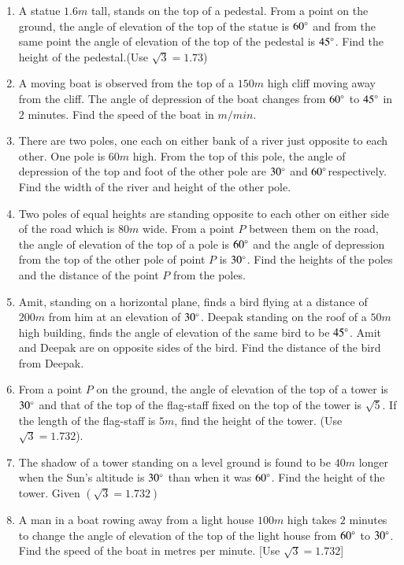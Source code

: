 \begin{enumerate}[label=\thesubsection.\arabic*.,ref=\thesubsection.\theenumi]
\begin{figure}[H]
\caption{}      
\label{fig:Fig-4.png}
\end{figure}
\hfill{}\item A statue $1.6m$ tall, stands on the top of a pedestal. From a point on the ground, the angle of elevation of the top of the statue is $60\degree$ and from the same point the angle of elevation of the top of the pedestal is $45\degree$. Find the height of the pedestal.(Use $\sqrt{3}=1.73$)
\hfill{}
\item A moving boat is observed from the top of a $150m$ high cliff moving away from the cliff. The angle of depression of the boat changes from $60\degree$ to $45\degree$ in $2$ minutes. Find the speed of the boat in $m/min$.
%
\hfill{}\item There are two poles, one each on either bank of a river just opposite to each other. One pole is $60m$ high. From the top of this pole, the angle of depression of the top and foot of the other pole are $30\degree$ and $60\degree$respectively. Find the width of the river and height of the other pole.
%
\hfill{}\item Two poles of equal heights are standing opposite to each other on either side of the road which is $80 m$ wide. From a point $P$ between them on the road, the angle of elevation of the top of a pole is $60\degree$ and the angle of depression from the top of the other pole of point $P$ is $30\degree$. Find the heights of the poles and the distance of the point $P$ from the poles.
%
\hfill{}\item Amit, standing on a horizontal plane, finds a bird flying at a distance of $200 m$ from him at an elevation of $30\degree$. Deepak standing on the roof of a $50 m$ high building, finds the angle of elevation of the same bird to be $45\degree$. Amit and Deepak are on opposite sides of the bird. Find the distance of the bird from Deepak.
%
\hfill{}\item From a point $P$ on the ground, the angle of elevation of the top of a tower is $30\degree$ and that of the top of the flag-staff fixed on the top of the tower is $\sqrt{5}$. If the length of the flag-staff is $5 m$, find the height of the tower. (Use $\sqrt{3}= 1.732$).
%
%
\hfill{}\item The shadow of a tower standing on a level ground is found to be $40 m$ longer when the Sun's altitude is $30\degree$ than when it was $60\degree$. Find the height of the tower. Given $(\sqrt{3} = 1.732)$
%
\hfill{}\item A man in a boat rowing away from a light house $100m$  high takes $2$ minutes to change the angle of elevation of the top of the light house from $60\degree$ to $30\degree$. Find the speed of the boat in metres per minute. [Use $\sqrt{3}=1.732$]

\end{enumerate}
